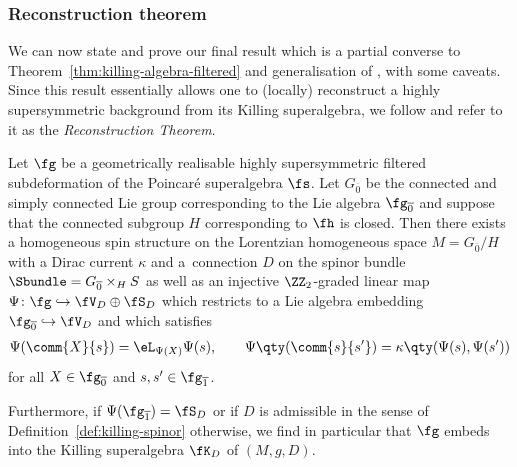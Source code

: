 \subsubsection{Reconstruction theorem}

We can now state and prove our final result which is a partial converse to Theorem~\ref{thm:killing-algebra-filtered} and generalisation of \cite[Theorem~13]{Figueroa-OFarrill2017_1}, with some caveats. Since this result essentially allows one to (locally) reconstruct a highly supersymmetric background from its Killing superalgebra, we follow \cite{Figueroa-OFarrill2017_1,Santi2022} and refer to it as the \emph{Reconstruction Theorem}.

\begin{Theorem}\label{thm:homog-spin-mfld}	
	Let $\fg$ be a geometrically realisable highly supersymmetric filtered subdeformation of the Poincar\'e superalgebra $\fs$.
	Let $G_{\overline0}$ be the connected and simply connected Lie group corresponding to the Lie algebra $\fg_{\overline0}$ and suppose that the connected subgroup $H$ corresponding to $\fh$ is closed.
	Then there exists a homogeneous spin structure on the Lorentzian homogeneous space $M=G_{\overline0}/H$ with a Dirac current $\kappa$ and a~connection $D$ on the spinor bundle $\Sbundle=G_{\overline 0}\times_H S$ as well as an injective $\ZZ_2$-graded linear map~${\Psi\colon\fg\hookrightarrow\fV_D\oplus\fS_D}$ which restricts to a Lie algebra embedding $\fg_{\overline 0}\hookrightarrow\fV_D$ and which satisfies
	\begin{align}\label{eq:reconstruct-brackets}
		\Psi(\comm{X}{s}) = \eL_{\Psi(X)}\Psi(s),
		\qquad \Psi\qty(\comm{s}{s'}) = \kappa\qty(\Psi(s),\Psi(s'))
	\end{align}
	for all $X\in\fg_{\overline 0}$ and $s,s'\in \fg_{\overline 1}$.
	
	Furthermore, if $\Psi(\fg_{\overline 1})=\fS_D$ or if $D$ is admissible in the sense of Definition~{\rm\ref{def:killing-spinor}} otherwise, we find in particular that $\fg$ embeds into the Killing superalgebra $\fK_D$ of $(M,g,D)$.
\end{Theorem}

